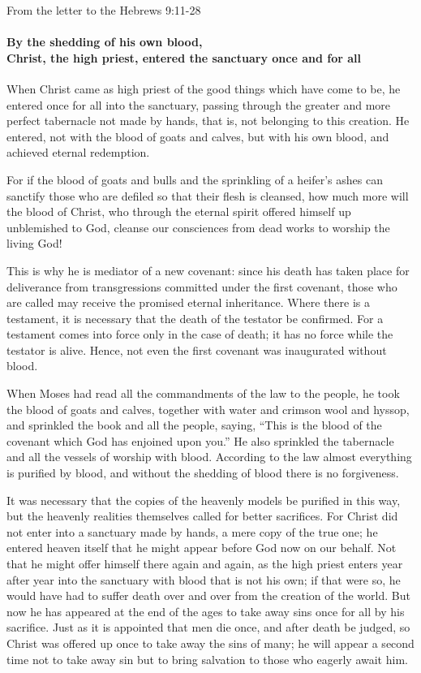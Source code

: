 From the letter to the Hebrews \hfill 9:11-28

\paragraph{By the shedding of his own blood, \\Christ, the high priest, entered the sanctuary once and for all}

\lettrine[lines=3]{W}{}hen Christ came as high priest of the good things which have come to be, he entered once for all into the sanctuary, passing through the greater and more perfect tabernacle not made by hands, that is, not belonging to this creation. He entered, not with the blood of goats and calves, but with his own blood, and achieved eternal redemption.

For if the blood of goats and bulls and the sprinkling of a heifer’s ashes can sanctify those who are defiled so that their flesh is cleansed, how much more will the blood of Christ, who through the eternal spirit offered himself up unblemished to God, cleanse our consciences from dead works to worship the living God!

This is why he is mediator of a new covenant: since his death has taken place for deliverance from transgressions committed under the first covenant, those who are called may receive the promised eternal inheritance. Where there is a testament, it is necessary that the death of the testator be confirmed. For a testament comes into force only in the case of death; it has no force while the testator is alive. Hence, not even the first covenant was inaugurated without blood.

When Moses had read all the commandments of the law to the people, he took the blood of goats and calves, together with water and crimson wool and hyssop, and sprinkled the book and all the people, saying, “This is the blood of the covenant which God has enjoined upon you.” He also sprinkled the tabernacle and all the vessels of worship with blood. According to the law almost everything is purified by blood, and without the shedding of blood there is no forgiveness.

It was necessary that the copies of the heavenly models be purified in this way, but the heavenly realities themselves called for better sacrifices. For Christ did not enter into a sanctuary made by hands, a mere copy of the true one; he entered heaven itself that he might appear before God now on our behalf. Not that he might offer himself there again and again, as the high priest enters year after year into the sanctuary with blood that is not his own; if that were so, he would have had to suffer death over and over from the creation of the world. But now he has appeared at the end of the ages to take away sins once for all by his sacrifice. Just as it is appointed that men die once, and after death be judged, so Christ was offered up once to take away the sins of many; he will appear a second time not to take away sin but to bring salvation to those who eagerly await him.

